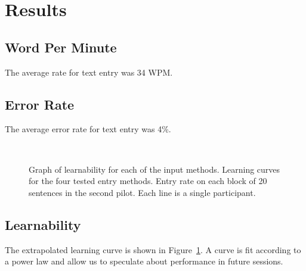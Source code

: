 \section{Results}
\subsection{Word Per Minute}
The average rate for text entry was 34 WPM.  

\subsection{Error Rate}
The average error rate for text entry was 4\%.  

\begin{figure}
\centering



\caption{
Graph of learnability for each of the input methods.
Learning curves for the four tested entry methods.
Entry rate on each block of 20 sentences in the second pilot.
Each line is a single participant.
}~\label{fig:learnability}
\end{figure}


\subsection{Learnability}
The extrapolated learning curve is shown in Figure~\ref{fig:learnability}.
A curve is fit according to a power law and allow us to speculate about performance in future sessions.

